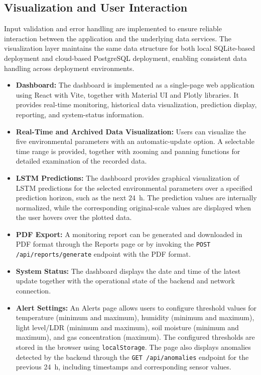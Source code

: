 ﻿\documentclass[journal]{IEEEtran}
\begin{document}
\subsection{Visualization and User Interaction}

Input validation and error handling are implemented to ensure reliable
interaction between the application and the underlying data services. The
visualization layer maintains the same data structure for both local
SQLite-based deployment and cloud-based PostgreSQL deployment, enabling
consistent data handling across deployment environments.

\begin{itemize}

    \item \textbf{Dashboard:} The dashboard is implemented as a single-page
    web application using React with Vite, together with Material UI and
    Plotly libraries. It provides real-time monitoring, historical data
    visualization, prediction display, reporting, and system-status
    information.

    \item \textbf{Real-Time and Archived Data Visualization:} Users can
    visualize the five environmental parameters with an automatic-update
    option. A selectable time range is provided, together with zooming and
    panning functions for detailed examination of the recorded data.

    \item \textbf{LSTM Predictions:} The dashboard provides graphical
    visualization of LSTM predictions for the selected environmental
    parameters over a specified prediction horizon, such as the next 24~h.
    The prediction values are internally normalized, while the corresponding
    original-scale values are displayed when the user hovers over the
    plotted data.

    \item \textbf{PDF Export:} A monitoring report can be generated and
    downloaded in PDF format through the Reports page or by invoking the
    \texttt{POST /api/reports/generate} endpoint with the PDF format.

    \item \textbf{System Status:} The dashboard displays the date and time
    of the latest update together with the operational state of the backend
    and network connection.

    \item \textbf{Alert Settings:} An Alerts page allows users to configure
    threshold values for temperature (minimum and maximum), humidity
    (minimum and maximum), light level/LDR (minimum and maximum), soil
    moisture (minimum and maximum), and gas concentration (maximum). The
    configured thresholds are stored in the browser using
    \texttt{localStorage}. The page also displays anomalies detected by the
    backend through the \texttt{GET /api/anomalies} endpoint for the previous
    24~h, including timestamps and corresponding sensor values.

\end{itemize}
\end{document}
